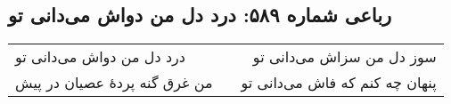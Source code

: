 \begin{center}
\section*{رباعی شماره ۵۸۹: درد دل من دواش می‌دانی تو}
\label{sec:sh589}
\begin{longtable}{l p{0.5cm} r}
درد دل من دواش می‌دانی تو
&&
سوز دل من سزاش می‌دانی تو
\\
من غرق گنه پردهٔ عصیان در پیش
&&
پنهان چه کنم که فاش می‌دانی تو
\\
\end{longtable}
\end{center}
